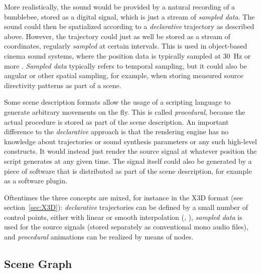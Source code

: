 More realistically,
the sound would be provided by a natural recording of a bumblebee,
stored as a digital signal,
which is just a stream of \emph{sampled data}.
The sound could then be spatialized according to
a \emph{declarative} trajectory as described above.
However,
the trajectory could just as well be stored as a stream of coordinates,
regularly \emph{sampled} at certain intervals.
This is used in object-based cinema sound systems,
where the position data is typically sampled at \qty{30}{\hertz} or more
\parencite{riedmiller2015immersive}.
\emph{Sampled data} typically refers to temporal sampling,
but it could also be angular or other spatial sampling,
for example, when storing measured source directivity patterns
as part of a scene.

Some scene description formats
allow the usage of a scripting language to generate arbitrary movements
on the fly.
This is called \emph{procedural}, because the actual procedure
is stored as part of the scene description.
An important difference to the \emph{declarative} approach is
that the rendering engine has no knowledge about trajectories or sound
synthesis parameters or any such high-level constructs.
It would instead just render the source signal at
whatever position the script generates at any given time.
The signal itself could also be generated by a piece of software
that is distributed as part of the scene description,
for example as a software plugin.

Oftentimes the three concepts are mixed,
for instance in the X3D format
(see section~\ref{sec:X3D}):
\emph{declarative} trajectories can be defined by a small number of control points,
either with linear or smooth interpolation
(, ),
\emph{sampled data} is used for the source signals
(stored separately as conventional mono audio files), and
\emph{procedural} animations can be realized by means of  nodes.


\subsection{Scene Graph}


